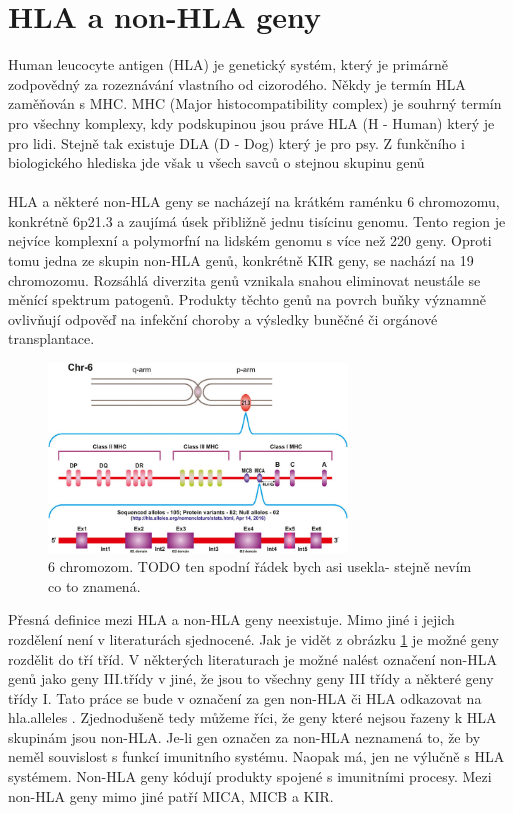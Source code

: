 \documentclass[czech,DP]{thesiskiv}
\begin{document}
\section{HLA a non-HLA geny}
Human leucocyte antigen (HLA) je genetický systém, který je primárně zodpovědný za rozeznávání vlastního od cizorodého. Někdy je termín HLA zaměňován s MHC. MHC (Major histocompatibility complex) je souhrný termín pro všechny komplexy, kdy podskupinou jsou práve HLA (H - Human) který je pro lidi. Stejně tak existuje DLA (D - Dog) který je pro psy. Z funkčního i biologického hlediska jde však u všech savců o stejnou skupinu genů
\\
\\
HLA a některé non-HLA geny se nacházejí na krátkém raménku 6 chromozomu, konkrétně 6p21.3 a zaujímá úsek přibližně jednu tisícinu genomu. Tento region je nejvíce komplexní a polymorfní na lidském genomu s více než 220 geny. Oproti tomu jedna ze skupin non-HLA genů, konkrétně KIR geny, se nachází na 19 chromozomu. Rozsáhlá diverzita genů vznikala snahou eliminovat neustále se měnící spektrum patogenů. Produkty těchto genů na povrch buňky významně ovlivňují odpověď na infekční choroby a výsledky buněčné či orgánové transplantace. \cite{imgt_hla_database}


\begin{figure}[H]		
		\centering
		\includegraphics[width=300px]{./img/genom6_mica.jpg}
		\caption{6 chromozom. TODO ten spodní řádek bych asi usekla- stejně nevím co to znamená. }
		\label{fig:hla_genome}
\end{figure}

\noindent
Přesná definice mezi HLA a non-HLA geny neexistuje. Mimo jiné i jejich rozdělení není v literaturách sjednocené. Jak je vidět z obrázku \ref{fig:hla_genome} je možné geny rozdělit do tří tříd. V některých literaturach je možné nalést označení non-HLA genů jako geny III.třídy v jiné, že jsou to všechny geny III třídy a některé geny třídy I. Tato práce se bude v označení za gen non-HLA či HLA odkazovat na hla.alleles \cite{imgt_hla_database}. Zjednodušeně tedy můžeme říci, že geny které nejsou řazeny k HLA skupinám jsou non-HLA. Je-li gen označen za non-HLA neznamená to, že by neměl souvislost s funkcí imunitního systému. Naopak má, jen ne výlučně s HLA systémem. Non-HLA geny kódují produkty spojené s imunitními procesy. Mezi non-HLA geny mimo jiné patří MICA, MICB a KIR. \cite{imgt_hla_database}
\end{document}

